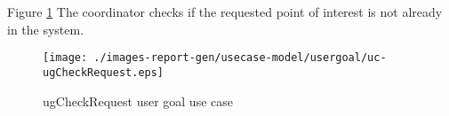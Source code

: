 Figure \ref{fig:lu.uni.lassy.excalibur.MyCrash.G02-RE-UCD-uc-ugCheckRequest}
The coordinator checks if the requested point of interest is not already in the system.

\begin{figure}[htbp]
\begin{center}

\texttt{[image: ./images-report-gen/usecase-model/usergoal/uc-ugCheckRequest.eps]}
\end{center}
\caption[lu.uni.lassy.excalibur.MyCrash.G02 Use Case Diagram: uc-ugCheckRequest]{ugCheckRequest user goal use case}
\label{fig:lu.uni.lassy.excalibur.MyCrash.G02-RE-UCD-uc-ugCheckRequest}
\end{figure}
\vspace{0.5cm}
